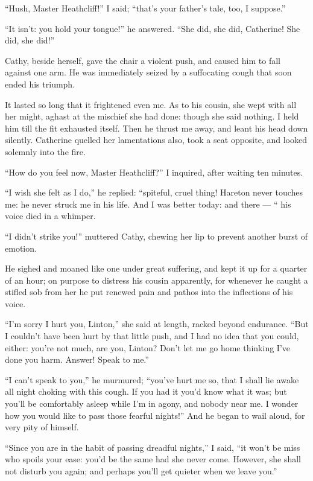 \par “Hush, Master Heathcliff!” I said; “that's your father's tale, too, I suppose.”
\par “It isn't: you hold your tongue!” he answered. “She did, she did, Catherine! She did, she did!”
\par Cathy, beside herself, gave the chair a violent push, and caused him to fall against one arm. He was immediately seized by a suffocating cough that soon ended his triumph.
\par It lasted so long that it frightened even me. As to his cousin, she wept with all her might, aghast at the mischief she had done: though she said nothing. I held him till the fit exhausted itself. Then he thrust me away, and leant his head down silently. Catherine quelled her lamentations also, took a seat opposite, and looked solemnly into the fire.
\par “How do you feel now, Master Heathcliff?” I inquired, after waiting ten minutes.
\par “I wish she felt as I do,” he replied: “spiteful, cruel thing! Hareton never touches me: he never struck me in his life. And I was better today: and there — “ his voice died in a whimper.
\par “I didn't strike you!” muttered Cathy, chewing her lip to prevent another burst of emotion.
\par He sighed and moaned like one under great suffering, and kept it up for a quarter of an hour; on purpose to distress his cousin apparently, for whenever he caught a stifled sob from her he put renewed pain and pathos into the inflections of his voice.
\par “I'm sorry I hurt you, Linton,” she said at length, racked beyond endurance. “But I couldn't have been hurt by that little push, and I had no idea that you could, either: you're not much, are you, Linton? Don't let me go home thinking I've done you harm. Answer! Speak to me.”
\par “I can't speak to you,” he murmured; “you've hurt me so, that I shall lie awake all night choking with this cough. If you had it you'd know what it was; but you'll be comfortably asleep while I'm in agony, and nobody near me. I wonder how you would like to pass those fearful nights!” And he began to wail aloud, for very pity of himself.
\par “Since you are in the habit of passing dreadful nights,” I said, “it won't be miss who spoils your ease: you'd be the same had she never come. However, she shall not disturb you again; and perhaps you'll get quieter when we leave you.”
